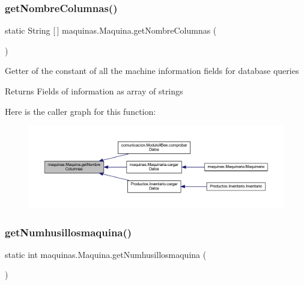 \subsubsection{\texorpdfstring{get\+Nombre\+Columnas()}{getNombreColumnas()}}
{\footnotesize\ttfamily static String \mbox{[}$\,$\mbox{]} maquinas.\+Maquina.\+get\+Nombre\+Columnas (\begin{DoxyParamCaption}{ }\end{DoxyParamCaption})\hspace{0.3cm}{\ttfamily [static]}}

Getter of the constant of all the machine information fields for database queries

\begin{DoxyReturn}{Returns}
Fields of information as array of strings 
\end{DoxyReturn}
Here is the caller graph for this function\+:
\nopagebreak
\begin{figure}[H]
\begin{center}
\leavevmode
\includegraphics[width=350pt]{classmaquinas_1_1_maquina_a47e430c44c10450125499adaeb26531c_icgraph}
\end{center}
\end{figure}
\mbox{\label{classmaquinas_1_1_maquina_a3107d0b82d1a52fce00723abdd6d47b2}} 
\subsubsection{\texorpdfstring{get\+Numhusillosmaquina()}{getNumhusillosmaquina()}}
{\footnotesize\ttfamily static int maquinas.\+Maquina.\+get\+Numhusillosmaquina (\begin{DoxyParamCaption}{ }\end{DoxyParamCaption})\hspace{0.3cm}{\ttfamily [static]}}

